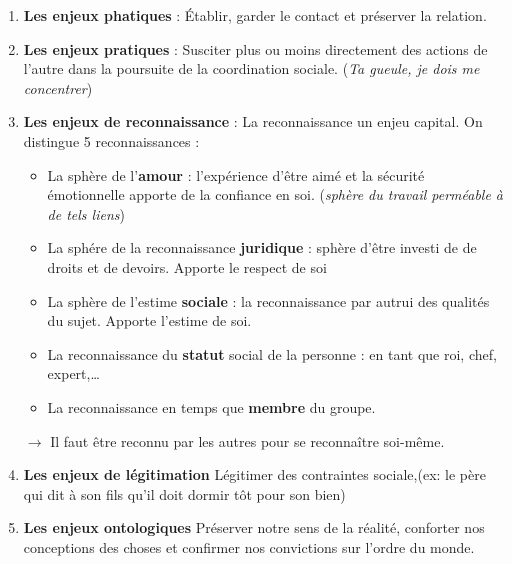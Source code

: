 \documentclass[11pt]{article} %
\begin{document}
\begin{enumerate}
        
    \item \textbf{Les enjeux phatiques} : Établir, garder le contact et
          préserver la relation.

    \item \textbf{Les enjeux pratiques} : Susciter plus ou moins
    directement des actions de l'autre dans la poursuite de la
    coordination sociale. (\textit{Ta gueule, je dois me concentrer})

    \item \textbf{Les enjeux de reconnaissance} : La reconnaissance
    un enjeu capital. On distingue 5 reconnaissances :
    \begin{itemize}
        \item La sphère de l'\textbf{amour} : l'expérience d'être aimé et
        la sécurité émotionnelle apporte de la confiance en soi.
        (\textit{sphère du travail perméable à de tels liens})

        \item La sphére de la reconnaissance \textbf{juridique} : sphère
        d'être investi de de droits et de devoirs. Apporte le respect de
        soi

        \item La sphère de l'estime \textbf{sociale} : la
        reconnaissance par autrui des qualités du sujet. Apporte
        l'estime de soi.

        \item La reconnaissance du \textbf{statut} social de la personne : en tant
        que roi, chef, expert,\ldots

        \item La reconnaissance en temps que \textbf{membre} du groupe.

    \end{itemize} 
    
    $\to$ Il faut être reconnu par les autres pour se reconnaître soi-même.

    \item \textbf{Les enjeux de légitimation} Légitimer des
    contraintes sociale,(ex: le père qui dit à son fils qu'il doit
    dormir tôt pour son bien)

     \item \textbf{Les enjeux ontologiques} Préserver notre sens de la
    réalité, conforter nos conceptions des choses et confirmer nos
    convictions sur l'ordre du monde.

\end{enumerate}
\end{document}
